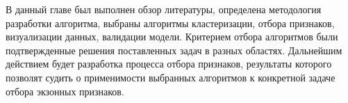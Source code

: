 В данный главе был выполнен обзор литературы, определена методология разработки алгоритма, выбраны алгоритмы кластеризации, отбора признаков, визуализации данных, валидации модели. Критерием отбора алгоритмов были подтвержденные решения поставленных задач в разных областях. Дальнейшим действием будет разработка процесса отбора признаков, результаты которого позволят судить о применимости выбранных алгоритмов к конкретной задаче отбора экзонных признаков.